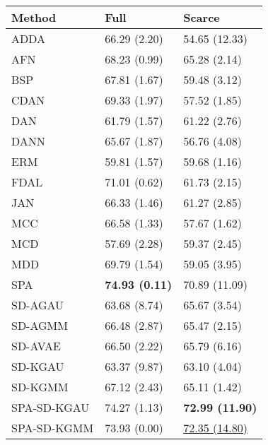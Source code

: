 \begin{tabular}{lll}
\toprule
Method & Full & Scarce \\
\midrule
ADDA & 66.29 (2.20) & 54.65 (12.33) \\
AFN & 68.23 (0.99) & 65.28 (2.14) \\
BSP & 67.81 (1.67) & 59.48 (3.12) \\
CDAN & 69.33 (1.97) & 57.52 (1.85) \\
DAN & 61.79 (1.57) & 61.22 (2.76) \\
DANN & 65.67 (1.87) & 56.76 (4.08) \\
ERM & 59.81 (1.57) & 59.68 (1.16) \\
FDAL & 71.01 (0.62) & 61.73 (2.15) \\
JAN & 66.33 (1.46) & 61.27 (2.85) \\
MCC & 66.58 (1.33) & 57.67 (1.62) \\
MCD & 57.69 (2.28) & 59.37 (2.45) \\
MDD & 69.79 (1.54) & 59.05 (3.95) \\
SPA & \textbf{74.93 (0.11)} & 70.89 (11.09) \\
\midrule
SD-AGAU & 63.68 (8.74) & 65.67 (3.54) \\
SD-AGMM & 66.48 (2.87) & 65.47 (2.15) \\
SD-AVAE & 66.50 (2.22) & 65.79 (6.16) \\
SD-KGAU & 63.37 (9.87) & 63.10 (4.04) \\
SD-KGMM & 67.12 (2.43) & 65.11 (1.42) \\
SPA-SD-KGAU & 74.27 (1.13) & \textbf{72.99 (11.90)} \\
SPA-SD-KGMM & 73.93 (0.00) & \underline{72.35 (14.80)} \\
\bottomrule
\end{tabular}
